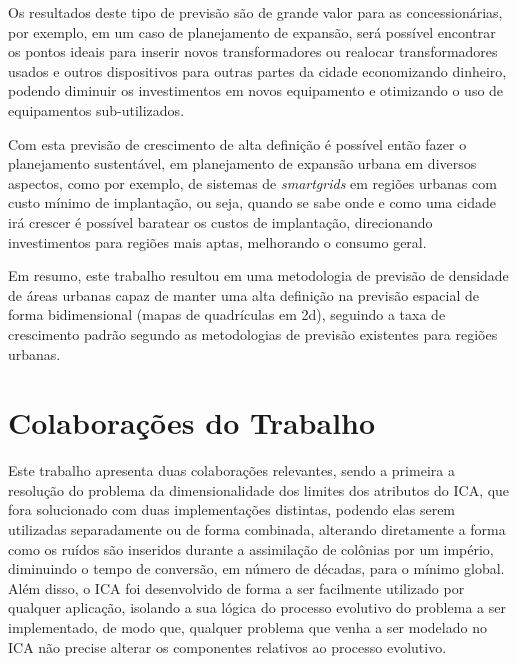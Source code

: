 Os resultados deste tipo de previsão são de grande valor para as concessionárias, por exemplo, em um caso de planejamento de expansão, será possível encontrar os pontos ideais para inserir novos transformadores ou realocar transformadores usados e outros dispositivos para outras partes da cidade economizando dinheiro, podendo diminuir os investimentos em novos equipamento e otimizando o uso de equipamentos sub-utilizados.

Com esta previsão de crescimento de alta definição é possível então fazer o planejamento sustentável, em planejamento de expansão urbana em diversos aspectos, como por exemplo, de sistemas de \emph{smartgrids} em regiões urbanas com custo mínimo de implantação, ou seja, quando se sabe onde e como uma cidade irá crescer é possível baratear os custos de implantação, direcionando investimentos para regiões mais aptas, melhorando o consumo geral.

Em resumo, este trabalho resultou em uma metodologia de previsão de densidade de áreas urbanas capaz de manter uma alta definição na previsão espacial de forma bidimensional (mapas de quadrículas em 2d),  seguindo a taxa de crescimento padrão segundo as metodologias de previsão existentes para regiões urbanas.


\section{Colaborações do Trabalho}
\label{colaborações_do_trabalho}


Este trabalho apresenta duas colaborações relevantes, sendo a primeira a resolução do problema da dimensionalidade dos limites dos atributos do ICA, que fora solucionado com duas implementações distintas, podendo elas serem utilizadas separadamente ou de forma combinada, alterando diretamente a forma como os ruídos são inseridos durante a assimilação de colônias por um império, diminuindo o tempo de conversão, em número de décadas, para o mínimo global. Além disso, o ICA foi desenvolvido de forma a ser facilmente utilizado por qualquer aplicação, isolando a sua lógica do processo evolutivo do problema a ser implementado, de modo que, qualquer problema que venha a ser modelado no ICA não precise alterar os componentes relativos ao processo evolutivo. 

